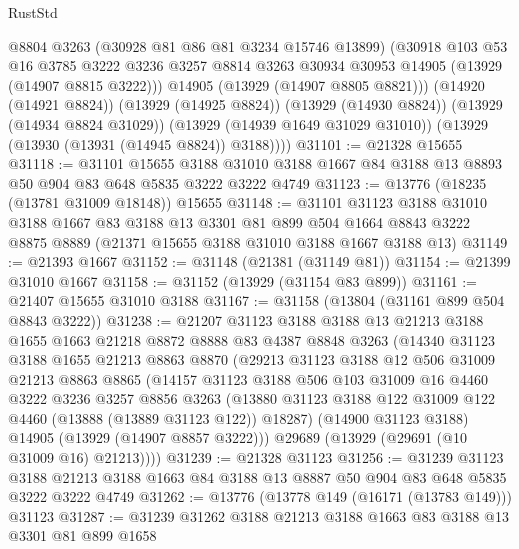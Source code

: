 \begin{lexlean}{RustStd}
\begin{coremodule}
          @8804
          @3263
          (@30928 @81 @86 @81 @3234 @15746 @13899)
          (@30918
            @103
            @53
            @16
            @3785
            @3222
            @3236
            @3257
            @8814
            @3263
            @30934
            @30953
            @14905
            (@13929 (@14907 @8815 @3222)))
          @14905
          (@13929 (@14907 @8805 @8821)))
        (@14920 (@14921 @8824))
        (@13929 (@14925 @8824))
        (@13929 (@14930 @8824))
        (@13929 (@14934 @8824 @31029))
        (@13929 (@14939 @1649 @31029 @31010))
        (@13929 (@13930 (@13931 (@14945 @8824)) @3188))))
@31101 := @21328 @15655
@31118 := @31101
    @15655
    @3188
    @31010
    @3188
    @1667
    @84
    @3188
    @13
    @8893
    @50
    @904
    @83
    @648
    @5835
    @3222
    @3222
    @4749
@31123 := @13776 (@18235 (@13781 @31009 @18148)) @15655
@31148 := @31101
    @31123
    @3188
    @31010
    @3188
    @1667
    @83
    @3188
    @13
    @3301
    @81
    @899
    @504
    @1664
    @8843
    @3222
    @8875
    @8889
    (@21371 @15655 @3188 @31010 @3188 @1667 @3188 @13)
@31149 := @21393 @1667
@31152 := @31148 (@21381 (@31149 @81))
@31154 := @21399 @31010 @1667
@31158 := @31152 (@13929 (@31154 @83 @899))
@31161 := @21407 @15655 @31010 @3188
@31167 := @31158 (@13804 (@31161 @899 @504 @8843 @3222))
@31238 := @21207
    @31123
    @3188
    @3188
    @13
    @21213
    @3188
    @1655
    @1663
    @21218
    @8872
    @8888
    @83
    @4387
    @8848
    @3263
    (@14340
      @31123
      @3188
      @1655
      @21213
      @8863
      @8870
      (@29213
        @31123
        @3188
        @12
        @506
        @31009
        @21213
        @8863
        @8865
        (@14157
          @31123
          @3188
          @506
          @103
          @31009
          @16
          @4460
          @3222
          @3236
          @3257
          @8856
          @3263
          (@13880 @31123 @3188 @122 @31009 @122 @4460 (@13888 (@13889 @31123 @122)) @18287)
          (@14900 @31123 @3188)
          @14905
          (@13929 (@14907 @8857 @3222)))
        @29689
        (@13929 (@29691 (@10 @31009 @16) @21213))))
@31239 := @21328 @31123
@31256 := @31239
    @31123
    @3188
    @21213
    @3188
    @1663
    @84
    @3188
    @13
    @8887
    @50
    @904
    @83
    @648
    @5835
    @3222
    @3222
    @4749
@31262 := @13776 (@13778 @149 (@16171 (@13783 @149))) @31123
@31287 := @31239
    @31262
    @3188
    @21213
    @3188
    @1663
    @83
    @3188
    @13
    @3301
    @81
    @899
    @1658

\end{coremodule}
\end{lexlean}
